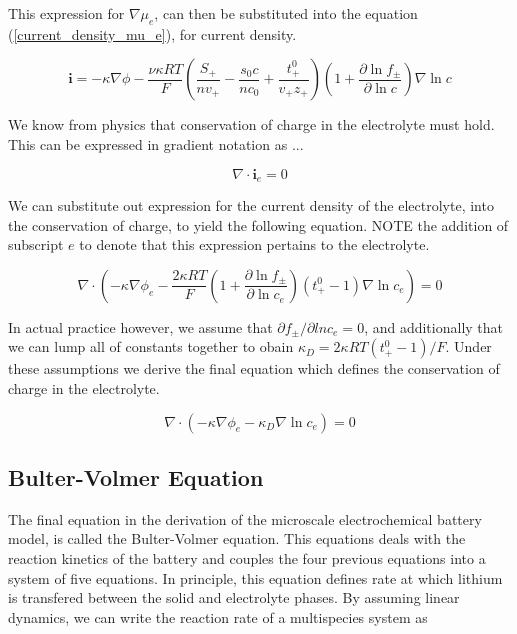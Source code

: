 \documentclass[lettersize,journal]{IEEEtran}
\begin{document}
\noindent This expression for $\nabla \mu_e$, can then be substituted into the equation (\ref{current_density_mu_e}), for current density.

\begin{equation}
\mathbf{i}=-\kappa \nabla \phi-\frac{\nu \kappa R T}{F}\left(\frac{S_{+}}{n v_{+}}-\frac{s_{0} c}{n c_{0}}+\frac{t_{+}^{0}}{v_{+} z_{+}}\right)\left(1+\frac{\partial \ln f_{\pm}}{\partial \ln c}\right) \nabla \ln c
\end{equation}

\noindent We know from physics that conservation of charge in the electrolyte must hold. This can be expressed in gradient notation as ...

\begin{equation}
  \nabla \cdot \mathbf{i}_e = 0
\end{equation}

\noindent We can substitute out expression for the current density of the electrolyte, into the conservation of charge, to yield the following equation. NOTE the addition of subscript $e$ to denote that this expression pertains to the electrolyte.

\begin{equation}
\nabla \cdot\left(-\kappa \nabla \phi_{e}-\frac{2 \kappa R T}{F}\left(1+\frac{\partial \ln f_{\pm}}{\partial \ln c_{e}}\right)\left(t_{+}^{0}-1\right) \nabla \ln c_{e}\right)=0
\end{equation}

\noindent In actual practice however, we assume that $\partial{f_{\pm}}/\partial ln {c_e} = 0 $, and additionally that we can lump all of constants together to obain $\kappa_{D}=2 \kappa R T\left(t_{+}^{0}-1\right) / F$. Under these assumptions we derive the final equation which defines the conservation of charge in the electrolyte.

\begin{equation}
\nabla \cdot\left(-\kappa \nabla \phi_{e}-\kappa_{D} \nabla \ln c_{e}\right)=0
\end{equation}


\subsection{Bulter-Volmer Equation}
The final equation in the derivation of the microscale electrochemical battery model, is called the Bulter-Volmer equation. This equations deals with the reaction kinetics of the battery and couples the four previous equations into a system of five equations. In principle, this equation defines rate at which lithium is transfered between the solid and electrolyte phases. By assuming linear dynamics, we can write the reaction rate of a multispecies system as
\end{document}
